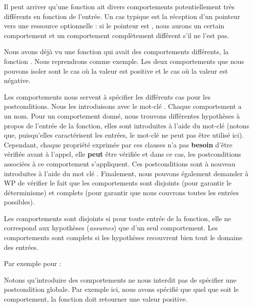 Il peut arriver qu'une fonction ait divers comportements potentiellement très
différents en fonction de l'entrée. Un cas typique est la réception d'un
pointeur vers une ressource optionnelle : si le pointeur est , nous
aurons un certain comportement et un comportement complètement différent s'il ne
l'est pas.



Nous avons déjà vu une fonction qui avait des comportements différents, la
fonction . Nous reprendrons comme exemple. Les deux
comportements que nous pouvons isoler sont le cas où la valeur est positive et
le cas où la valeur est négative.



Les comportements nous servent à spécifier les différents cas pour les
postconditions. Nous les introduisons avec le mot-clé .
Chaque comportement a un nom. Pour un comportement donné, nous trouvons
différentes hypothèses à propos de l'entrée de la fonction, elles sont
introduites à l'aide du mot-clé  (notons que, puisqu'elles
caractérisent les entrées, le mot-clé  ne peut
pas être utilisé ici). Cependant, chaque propriété exprimée par ces clauses
n'a pas \textbf{besoin} d'être vérifiée avant à l'appel, elle \textbf{peut}
être vérifiée et dans ce cas, les postconditions associées à ce comportement
s'appliquent. Ces postconditions sont à nouveau introduites à l'aide du mot
clé . Finalement, nous pouvons également demander à WP
de vérifier le fait que les comportements sont disjoints (pour garantir
le déterminisme) et complets (pour garantir que nous couvrons toutes les
entrées possibles).



Les comportements sont disjoints si pour toute entrée de la fonction, elle ne
correspond aux hypothèses (\textit{assumes}) que d'un seul comportement. Les
comportements sont complets si les hypothèses recouvrent bien tout le domaine
des entrées.



Par exemple pour  :





Notons qu'introduire des comportements ne nous interdit pas de spécifier une
postcondition globale. Par exemple ici, nous avons spécifié que quel que soit
le comportement, la fonction doit retourner une valeur positive.


